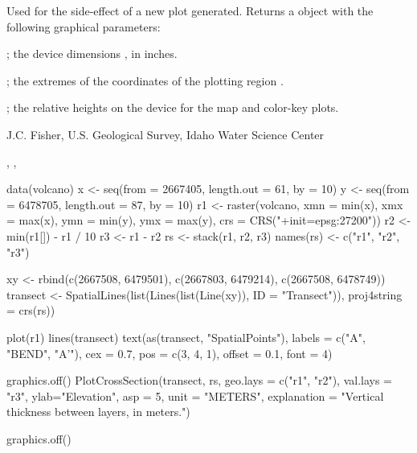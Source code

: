 \documentclass[letterpaper]{book}
\begin{document}
%
\begin{Value}
Used for the side-effect of a new plot generated.
Returns a  object with the following graphical parameters:
\begin{ldescription}
\item[\code{din}] ; the device dimensions , in inches.
\item[\code{usr}] ; the extremes of the coordinates of the plotting region .
\item[\code{heights}] ; the relative heights on the device  for the map and color-key plots.
\end{ldescription}
\end{Value}
%
\begin{Author}\relax
J.C. Fisher, U.S. Geological Survey, Idaho Water Science Center
\end{Author}
%
\begin{SeeAlso}\relax
{}, , 
\end{SeeAlso}
%
\begin{Examples}
\begin{ExampleCode}
data(volcano)
x <- seq(from = 2667405, length.out = 61, by = 10)
y <- seq(from = 6478705, length.out = 87, by = 10)
r1 <- raster(volcano, xmn = min(x), xmx = max(x), ymn = min(y), ymx = max(y),
             crs = CRS("+init=epsg:27200"))
r2 <- min(r1[]) - r1 / 10
r3 <- r1 - r2
rs <- stack(r1, r2, r3)
names(rs) <- c("r1", "r2", "r3")

xy <- rbind(c(2667508, 6479501), c(2667803, 6479214), c(2667508, 6478749))
transect <- SpatialLines(list(Lines(list(Line(xy)), ID = "Transect")),
                         proj4string = crs(rs))

plot(r1)
lines(transect)
text(as(transect, "SpatialPoints"), labels = c("A", "BEND", "A'"), cex = 0.7,
     pos = c(3, 4, 1), offset = 0.1, font = 4)

graphics.off()
PlotCrossSection(transect, rs, geo.lays = c("r1", "r2"), val.lays = "r3",
                 ylab="Elevation", asp = 5, unit = "METERS",
                 explanation = "Vertical thickness between layers, in meters.")

graphics.off()
\end{ExampleCode}
\end{Examples}
\end{document}
